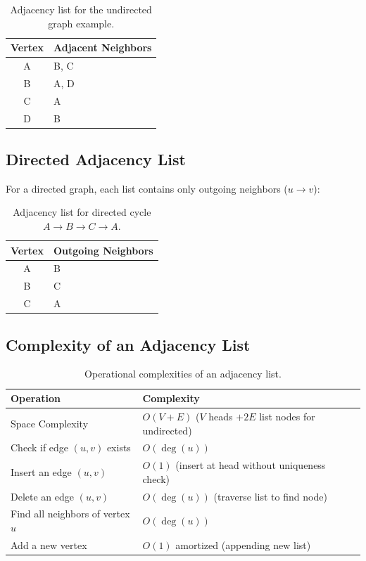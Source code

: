 \begin{table}[htbp]
\centering
\small
\begin{tabular}{c l}
\toprule
\textbf{Vertex} & \textbf{Adjacent Neighbors} \\
\midrule
A & B, C \\
B & A, D \\
C & A \\
D & B \\
\bottomrule
\end{tabular}
\caption{Adjacency list for the undirected graph example.}
\end{table}

\subsection{Directed Adjacency List}
For a directed graph, each list contains only outgoing neighbors ($u \to v$):

\begin{table}[htbp]
\centering
\small
\begin{tabular}{c l}
\toprule
\textbf{Vertex} & \textbf{Outgoing Neighbors} \\
\midrule
A & B \\
B & C \\
C & A \\
\bottomrule
\end{tabular}
\caption{Adjacency list for directed cycle $A \to B \to C \to A$.}
\end{table}

\subsection{Complexity of an Adjacency List}

\begin{table}[htbp]
\centering
\small
\begin{tabularx}{\textwidth}{X p{7cm}}
\toprule
\textbf{Operation} & \textbf{Complexity} \\
\midrule
Space Complexity & $O(V + E)$ ($V$ heads $+ 2E$ list nodes for undirected) \\
Check if edge $(u, v)$ exists & $O(\deg(u))$ \\
Insert an edge $(u, v)$ & $O(1)$ (insert at head without uniqueness check) \\
Delete an edge $(u, v)$ & $O(\deg(u))$ (traverse list to find node) \\
Find all neighbors of vertex $u$ & $O(\deg(u))$ \\
Add a new vertex & $O(1)$ amortized (appending new list) \\
\bottomrule
\end{tabularx}
\caption{Operational complexities of an adjacency list.}
\end{table}


